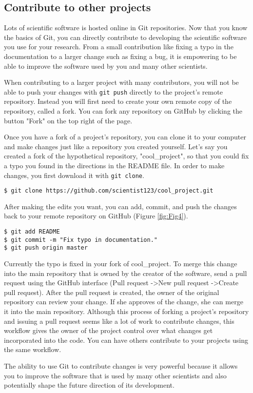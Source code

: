 \subsection{Contribute to other projects}

Lots of scientific software is hosted online in Git repositories.
Now that you know the basics of Git, you can directly contribute to developing the scientific software you use for your research.
From a small contribution like fixing a typo in the documentation to a larger change such as fixing a bug, it is empowering to be able to improve the software used by you and many other scientists.

When contributing to a larger project with many contributors, you will not be able to push your changes with \verb|git push| directly to the project's remote repository.
Instead you will first need to create your own remote copy of the repository, called a fork.
You can fork any repository on GitHub by clicking the button "Fork" on the top right of the page.

Once you have a fork of a project's repository, you can clone it to your computer and make changes just like a repository you created yourself.
Let's say you created a fork of the hypothetical repository, "cool\_project", so that you could fix a typo you found in the directions in the README file.
In order to make changes, you first download it with \verb|git clone|.

\begin{lstlisting}
$ git clone https://github.com/scientist123/cool_project.git
\end{lstlisting}

After making the edits you want, you can add, commit, and push the changes back to your remote repository on GitHub (Figure \ref{fig:Fig4}).

\begin{lstlisting}
$ git add README
$ git commit -m "Fix typo in documentation."
$ git push origin master
\end{lstlisting}

Currently the typo is fixed in your fork of cool\_project.
To merge this change into the main repository that is owned by the creator of the software, send a pull request using the GitHub interface (Pull request -\textgreater New pull request -\textgreater Create pull request).
After the pull request is created, the owner of the original repository can review your change.
If she approves of the change, she can merge it into the main repository.
Although this process of forking a project’s repository and issuing a pull request seems like a lot of work to contribute changes, this workflow gives the owner of the project control over what changes get incorporated into the code. You can have others contribute to your projects using the same workflow. 

The ability to use Git to contribute changes is very powerful because it allows you to improve the software that is used by many other scientists and also potentially shape the future direction of its development.
